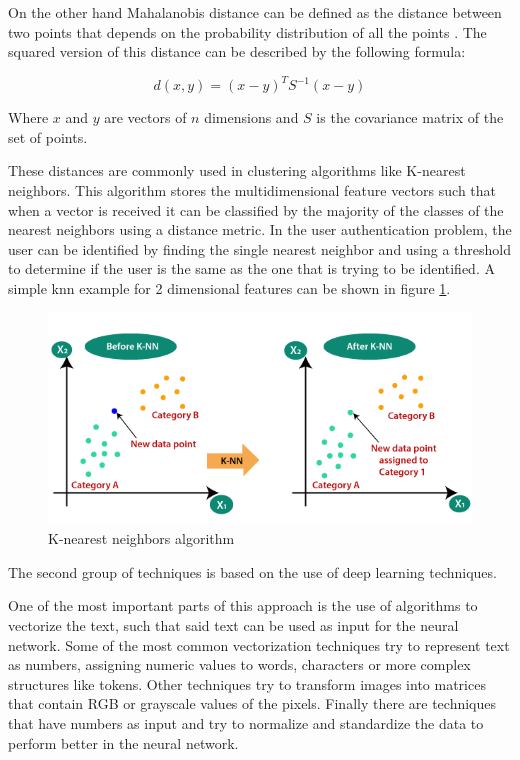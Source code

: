 On the other hand Mahalanobis distance can be defined as the distance between two points that depends on the probability distribution of all the points \cite{de2000mahalanobis}. The squared version of this distance can be described by the following formula:

\begin{equation}
	d(x,y) = (x-y)^T S^{-1} (x-y)
\end{equation}

Where $x$ and $y$ are vectors of $n$ dimensions and $S$ is the covariance matrix of the set of points.


These distances are commonly used in clustering algorithms like K-nearest neighbors. This algorithm stores the multidimensional feature vectors such that when a vector is received it can be classified by the majority of the classes of the nearest neighbors using a distance metric. In the user authentication problem, the user can be identified by finding the single nearest neighbor and using a threshold to determine if the user is the same as the one that is trying to be identified. A simple knn example for 2 dimensional features can be shown in figure \ref{fig:knn}.

\begin{figure}[h]
    \centering
    \includegraphics[width=0.7\linewidth]{images/knn}
    \caption{K-nearest neighbors algorithm \cite{knn}}
    \label{fig:knn}
\end{figure}

The second group of techniques is based on the use of deep learning techniques.

One of the most important parts of this approach is the use of algorithms to vectorize the text, such that said text can be used as input for the neural network. Some of the most common vectorization techniques try to represent text as numbers, assigning numeric values to words, characters or more complex structures like tokens. Other techniques try to transform images into matrices that contain RGB or grayscale values of the pixels. Finally there are techniques that have numbers as input and try to normalize and standardize the data to perform better in the neural network.

